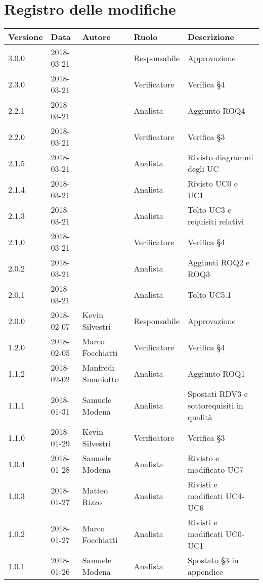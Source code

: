 \documentclass[./AnalisideiRequisiti.tex]{subfiles}
\begin{document}
	
{
	\chapter*{Registro delle modifiche}
\setlength\LTleft{-22mm}
	\begin{longtable}{|p{20mm}|p{20mm}|p{40mm}|p{30mm}|p{50mm}|}
		\hline
		\textbf{Versione} & \textbf{Data} & \textbf{Autore} & \textbf{Ruolo} & \textbf{Descrizione} \\ \hline 
		    
		3.0.0 & 2018-03-21 &  & Responsabile & Approvazione\\ \hline 
		2.3.0 & 2018-03-21 &  & Verificatore & Verifica §4\\ \hline 		
		2.2.1 & 2018-03-21 &  & Analista & Aggiunto ROQ4\\ \hline 
		2.2.0 & 2018-03-21 &  & Verificatore & Verifica §3\\ \hline 
		2.1.5 & 2018-03-21 &  & Analista & Rivisto diagrammi degli UC\\ \hline
		2.1.4 & 2018-03-21 &  & Analista & Rivisto UC0 e UC1\\ \hline
		2.1.3 & 2018-03-21 &  & Analista & Tolto UC3 e requisiti relativi\\ \hline
		2.1.0 & 2018-03-21 &  & Verificatore & Verifica §4\\ \hline
		2.0.2 & 2018-03-21 &  & Analista & Aggiunti ROQ2 e ROQ3\\ \hline
		2.0.1 & 2018-03-21 &  & Analista & Tolto UC5.1\\ \hline
		2.0.0 & 2018-02-07 & Kevin Silvestri & Responsabile & Approvazione\\ \hline 
		1.2.0 & 2018-02-05 & Marco Focchiatti & Verificatore & Verifica §4\\ \hline    
		1.1.2 & 2018-02-02 & Manfredi Smaniotto & Analista & Aggiunto ROQ1\\ \hline 
		1.1.1 & 2018-01-31 & Samuele Modena & Analista & Spostati RDV3 e sottorequisiti in qualità\\ \hline  
		1.1.0 & 2018-01-29 & Kevin Silvestri & Verificatore & Verifica §3\\ \hline  
		1.0.4 & 2018-01-28 & Samuele Modena & Analista & Rivisto e modificato UC7\\ \hline  
		1.0.3 & 2018-01-27 & Matteo Rizzo & Analista & Rivisti e modificati UC4-UC6\\ \hline    
		1.0.2 & 2018-01-27 & Marco Focchiatti & Analista & Rivisti e modificati UC0-UC1\\ \hline  
		1.0.1 & 2018-01-26 & Samuele Modena & Analista & Spostato §3 in appendice\\ \hline

\end{longtable}}
\end{document}
